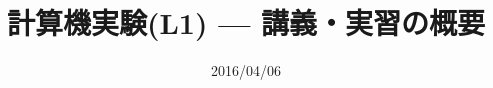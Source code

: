 \documentclass[dvipdfmx]{beamer}
\title{計算機実験(L1) --- 講義・実習の概要}
\date{2016/04/06}
\begin{document}
\begin{frame}
  \titlepage
  \tableofcontents
\end{frame}





\end{document}
